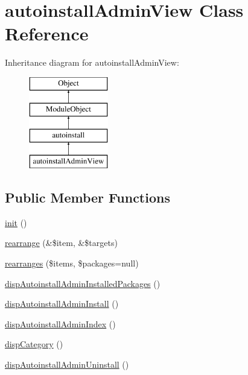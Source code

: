 \hypertarget{classautoinstallAdminView}{\section{autoinstall\-Admin\-View Class Reference}
\label{classautoinstallAdminView}
}
Inheritance diagram for autoinstall\-Admin\-View\-:\begin{figure}[H]
\begin{center}
\leavevmode
\includegraphics[height=4.000000cm]{classautoinstallAdminView}
\end{center}
\end{figure}
\subsection*{Public Member Functions}
\begin{DoxyCompactItemize}
\item 
\hyperlink{classautoinstallAdminView_a206401d0dc48b6d0e60f1520ba972526}{init} ()
\item 
\hyperlink{classautoinstallAdminView_a55e52a58461106215866abf53264edb5}{rearrange} (\&\$item, \&\$targets)
\item 
\hyperlink{classautoinstallAdminView_a16c6adf0c6d6f8bb24851dd5b68416f5}{rearranges} (\$items, \$packages=null)
\item 
\hyperlink{classautoinstallAdminView_a57de04bc93c4b62ad0c8fff257b4a837}{disp\-Autoinstall\-Admin\-Installed\-Packages} ()
\item 
\hyperlink{classautoinstallAdminView_a096fdb7d03bea9f0b1a48dd5f471bbd2}{disp\-Autoinstall\-Admin\-Install} ()
\item 
\hyperlink{classautoinstallAdminView_af3c3bcabc77b8e0d812db60bfc8bc621}{disp\-Autoinstall\-Admin\-Index} ()
\item 
\hyperlink{classautoinstallAdminView_ac3b285aaf0eb96bbfb2986917ca3571b}{disp\-Category} ()
\item 
\hyperlink{classautoinstallAdminView_a5f7303fa7b93ab464b65e0917b8d75ca}{disp\-Autoinstall\-Admin\-Uninstall} ()
\end{DoxyCompactItemize}

